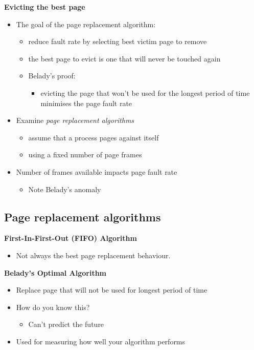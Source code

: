\documentclass[11pt,a4paper]{article}
\begin{document}
\textbf{Evicting the best page}
\begin{itemize}
    \item The goal of the page replacement algorithm:
        \begin{itemize}
            \item reduce fault rate by selecting best victim page to remove
            \item the best page to evict is one that will never be touched again
            \item Belady's proof:
                \begin{itemize}
                    \item evicting the page that won't be used for the longest period of time
                        minimises the page fault rate
                \end{itemize}
        \end{itemize}
    \item Examine \emph{page replacement algorithms}
        \begin{itemize}
            \item assume that a process pages against itself
            \item using a fixed number of page frames
        \end{itemize}
    \item Number of frames available impacts page fault rate
        \begin{itemize}
            \item Note Belady's anomaly
        \end{itemize}
\end{itemize}

\subsection{Page replacement algorithms}

\textbf{First-In-First-Out (FIFO) Algorithm}
\begin{itemize}
    \item Not always the best page replacement behaviour.
\end{itemize}

\textbf{Belady's Optimal Algorithm}
\begin{itemize}
    \item Replace page that will not be used for longest period of time
    \item How do you know this?
        \begin{itemize}
            \item Can't predict the future
        \end{itemize}
    \item Used for measuring how well your algorithm performs
\end{itemize}
\end{document}
